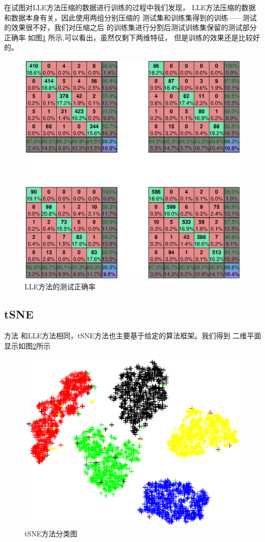 \documentclass[UTF8,a4paper]{paper}
\begin{document}
在试图对LLE方法压缩的数据进行训练的过程中我们发现，
LLE方法压缩的数据和数据本身有关，因此使用两组分别压缩的
测试集和训练集得到的训练——测试的效果很不好，我们对压缩之后
的训练集进行分割后测试训练集保留的测试部分正确率
如图\ref{fig6}
所示,可以看出，虽然仅剩下两维特征，
但是训练的效果还是比较好的。

\begin{figure}
\centering
\includegraphics[width = \textwidth]{NNlle.eps}
\caption{LLE方法的测试正确率}
\label{fig6}
\end{figure}

\subsection{tSNE}方法
和LLE方法相同，tSNE方法也主要基于给定的算法框架。我们得到
二维平面显示如图\ref{fig7}所示

\begin{figure}
\centering
\includegraphics[width=\textwidth]{tsne.eps}
\caption{tSNE方法分类图}
\label{fig7}
\end{figure}
\end{document}
